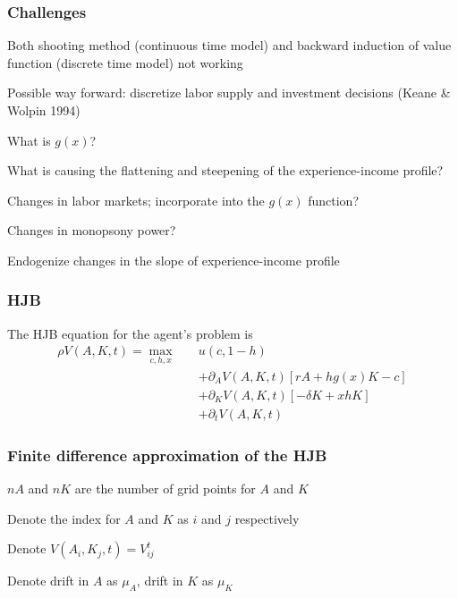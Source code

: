 \documentclass[aspectratio=169]{beamer}
\newenvironment{wideitemize}{\itemize\addtolength{\itemsep}{10pt}}{\enditemize}
\begin{document}
\begin{frame}
    \frametitle{Challenges}

    \begin{wideitemize}
        \item Both shooting method (continuous time model) and backward induction of value function (discrete time model) not working
        \item Possible way forward: discretize labor supply and investment decisions (Keane \& Wolpin 1994)
        \item What is $g(x)$?
        \item What is causing the flattening and steepening of the experience-income profile?
        \begin{wideitemize}
            \item Changes in labor markets; incorporate into the $g(x)$ function?
            \item Changes in monopsony power?
            \item Endogenize changes in the slope of experience-income profile
        \end{wideitemize}
    \end{wideitemize}

\end{frame}

\begin{frame}
    \frametitle{HJB}

    The HJB equation for the agent's problem is
    \begin{align*}
        \rho V(A, K, t) = \max_{c, h, x} \quad &u(c, 1-h) \\
        &+ \partial_A V(A, K, t) \left[rA + h g(x) K - c \right] \\
        &+ \partial_K V(A, K, t) \left[-\delta K + x h K \right] \\
        &+ \partial_t V(A, K, t)
    \end{align*}

\end{frame}

\begin{frame}
    \frametitle{Finite difference approximation of the HJB}

    \begin{wideitemize}
        \item $nA$ and $nK$ are the number of grid points for $A$ and $K$
        \item Denote the index for $A$ and $K$ as $i$ and $j$ respectively
        \item Denote $V(A_i, K_j, t) = V_{ij}^t$
        \item Denote drift in $A$ as $\mu_A$, drift in $K$ as $\mu_K$
    \end{wideitemize}

\end{frame}
\end{document}

